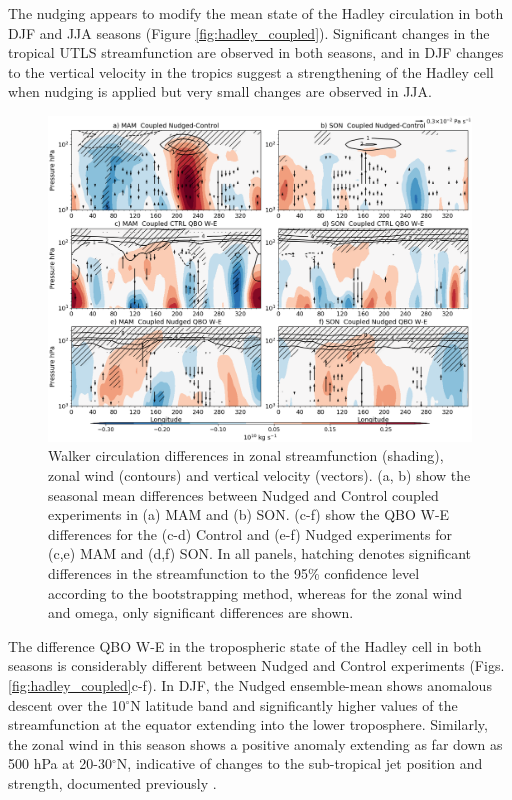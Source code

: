 The nudging appears to modify the mean state of the Hadley circulation in both DJF and JJA seasons (Figure \ref{fig:hadley_coupled}). Significant changes in the tropical UTLS streamfunction are observed in both seasons, and in DJF changes to the vertical velocity in the tropics suggest a strengthening of the Hadley cell when nudging is applied but very small changes are observed in JJA. 

\begin{figure}[t!]
\centering
 \includegraphics[width=\linewidth]{figures/suite_coupledwalker.png}
\caption[Walker circulation in coupled nudged experiments.]{Walker circulation differences in zonal streamfunction (shading), zonal wind (contours) and vertical velocity (vectors). (a, b) show the seasonal mean differences between Nudged and Control coupled experiments in (a) MAM and (b) SON. (c-f) show the QBO W-E differences for the (c-d) Control and (e-f) Nudged experiments for (c,e) MAM and (d,f) SON. In all panels, hatching denotes significant differences in the streamfunction to the 95\% confidence level according to the bootstrapping method, whereas for the zonal wind and omega, only significant differences are shown.}
\label{fig:walker_coupled}
\end{figure}

The difference QBO W-E in the tropospheric state of the Hadley cell in both seasons is considerably different between Nudged and Control experiments (Figs. \ref{fig:hadley_coupled}c-f). 
In DJF, the Nudged ensemble-mean shows anomalous descent over the 10$^\circ$N latitude band and significantly higher values of the streamfunction at the equator extending into the lower troposphere. Similarly, the zonal wind in this season shows a positive anomaly extending as far down as 500 hPa at 20-30$^\circ$N, indicative of changes to the sub-tropical jet position and strength, documented previously \citep[e.g.][]{garfinkel2010}.

